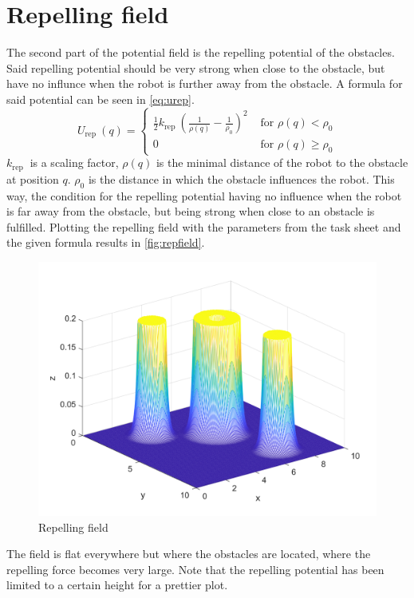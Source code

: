 \documentclass[11pt]{article}
\begin{document}
    \section{Repelling field}\label{sec:rep-field}
    The second part of the potential field is the repelling potential of the obstacles.
    Said repelling potential should be very strong when close to the obstacle, but have no influnce when the robot is further away from the obstacle.
    A formula for said potential can be seen in \autoref{eq:urep}.
    \begin{equation}\label{eq:urep}
        U_{\text {rep }}(q)=\left\{\begin{array}{ll}
                                       \frac{1}{2} k_{\text {rep }}\left(\frac{1}{\rho(q)}-\frac{1}{\rho_{0}}\right)^{2} & \text { for } \rho(q)<\rho_{0} \\
                                       0 & \text { for } \rho(q) \geq \rho_{0}
        \end{array}\right.
    \end{equation}
    $k_{\text {rep }}$ is a scaling factor, $\rho(q)$ is the minimal distance of the robot to the obstacle at position $q$.
    $\rho_{0}$ is the distance in which the obstacle influences the robot.
    This way, the condition for the repelling potential having no influence when the robot is far away from the obstacle, but being strong when close to an obstacle is fulfilled.
    Plotting the repelling field with the parameters from the task sheet and the given formula results in \autoref{fig:repfield}.
    \begin{figure}[H]
        \centering
        \includegraphics[width=1.0\textwidth]{../test/images/u_rep}
        \caption{Repelling field}
        \label{fig:repfield}
    \end{figure}
    The field is flat everywhere but where the obstacles are located, where the repelling force becomes very large.
    Note that the repelling potential has been limited to a certain height for a prettier plot.
\end{document}
